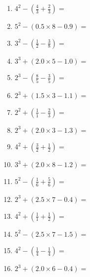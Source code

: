 \documentclass[12pt]{article}
\begin{document}
\begin{enumerate}
\item \large $ 4^{2} - (\frac{4}{3} + \frac{2}{3}) = $ \vspace{1.6cm}
\item \large $ 5^{2} - (0.5 \times 8 - 0.9) = $ \vspace{1.6cm}
\item \large $ 3^{2} - (\frac{1}{2} - \frac{3}{8}) = $ \vspace{1.6cm}
\item \large $ 3^{3} + (2.0 \times 5 - 1.0) = $ \vspace{1.6cm}
\item \large $ 2^{3} - (\frac{8}{5} - \frac{3}{5}) = $ \vspace{1.6cm}
\item \large $ 2^{3} + (1.5 \times 3 - 1.1) = $ \vspace{1.6cm}
\newpage
\item \large $ 2^{2} + (\frac{1}{1} - \frac{2}{3}) = $ \vspace{1.6cm}
\item \large $ 2^{3} + (2.0 \times 3 - 1.3) = $ \vspace{1.6cm}
\item \large $ 4^{2} + (\frac{3}{2} + \frac{1}{2}) = $ \vspace{1.6cm}
\item \large $ 3^{3} + (2.0 \times 8 - 1.2) = $ \vspace{1.6cm}
\item \large $ 5^{2} - (\frac{1}{6} + \frac{5}{6}) = $ \vspace{1.6cm}
\item \large $ 2^{3} + (2.5 \times 7 - 0.4) = $ \vspace{1.6cm}
\item \large $ 4^{2} + (\frac{1}{1} + \frac{1}{2}) = $ \vspace{1.6cm}
\item \large $ 5^{2} - (2.5 \times 7 - 1.5) = $ \vspace{1.6cm}
\item \large $ 4^{2} - (\frac{1}{4} - \frac{1}{4}) = $ \vspace{1.6cm}
\item \large $ 2^{3} + (2.0 \times 6 - 0.4) = $ \vspace{1.6cm}
\end{enumerate}\newpage
\end{document}
